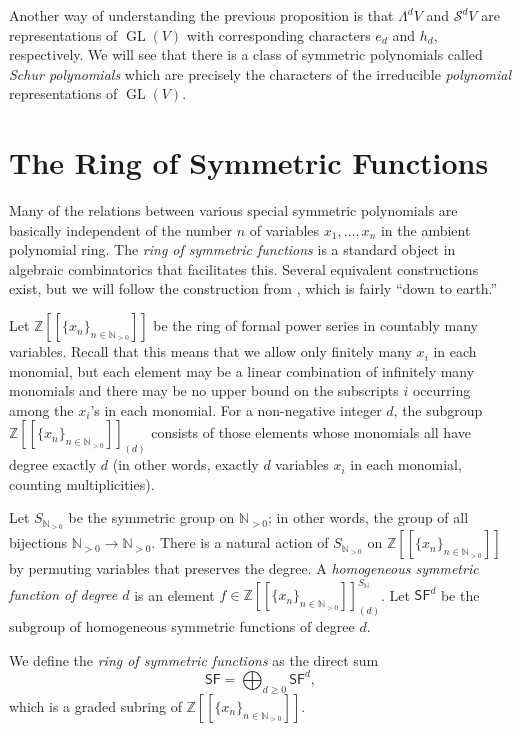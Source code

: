 \documentclass[12pt]{article}
\theoremstyle{plain}
\theoremstyle{definition}
\theoremstyle{remark}
\numberwithin{equation}{section}
\begin{document}
Another way of understanding the previous proposition is that
$\Lambda^d V$ and $\mathcal{S}^d V$ are representations of
$\operatorname{GL}(V)$ with corresponding characters $e_d$ and
$h_d$, respectively.
We will see that there is a class of symmetric polynomials
called \emph{Schur polynomials} which are precisely the characters
of the irreducible \emph{polynomial} representations of
$\operatorname{GL}(V)$.


\section{The Ring of Symmetric Functions}

Many of the relations between various special symmetric polynomials are
basically independent of the number $n$ of variables $x_1,\ldots,x_n$
in the ambient polynomial ring.  The \emph{ring of symmetric functions}
is a standard object in algebraic combinatorics that facilitates
this.  Several equivalent constructions exist, but we will follow
the construction from \cite{Stanley2}, which is fairly ``down to earth.''

Let $\mathbb{Z}[[\{x_n\}_{n \in \mathbb{N}_{>0}}]]$ be the ring of formal
power series in countably many variables.  Recall that this means that
we allow only finitely many $x_i$ in each monomial, but each element may be
a linear combination of infinitely many monomials and there may be no upper
bound on the subscripts $i$ occurring among the $x_i$'s in each
monomial.
For a non-negative integer $d$, the subgroup
$\mathbb{Z}[[\{x_n\}_{n \in \mathbb{N}_{>0}}]]_{(d)}$ consists of those
elements whose monomials all have degree exactly $d$ (in other words,
exactly $d$ variables $x_i$ in each monomial, counting multiplicities).

Let $S_{\mathbb{N}_{>0}}$ be the symmetric group on $\mathbb{N}_{>0}$; in other
words, the group of all bijections $\mathbb{N}_{>0} \to \mathbb{N}_{>0}$.
There is a natural action of $S_{\mathbb{N}_{>0}}$ on
$\mathbb{Z}[[\{x_n\}_{n \in \mathbb{N}_{>0}}]]$ by permuting variables that
preserves the degree.
A \emph{homogeneous symmetric function of degree $d$} is an element
$f \in \mathbb{Z}[[\{x_n\}_{n \in \mathbb{N}_{>0}}]]_{(d)}^{S_{\mathbb{N}}}$.
Let $\mathsf{SF}^d$ be the subgroup of
homogeneous symmetric functions of degree $d$.

We define the \emph{ring of symmetric functions} as the direct sum
\[
\mathsf{SF} = \bigoplus_{d \ge 0} \mathsf{SF}^d,
\]
which is a graded subring of $\mathbb{Z}[[\{x_n\}_{n \in \mathbb{N}_{>0}}]]$.
\end{document}
